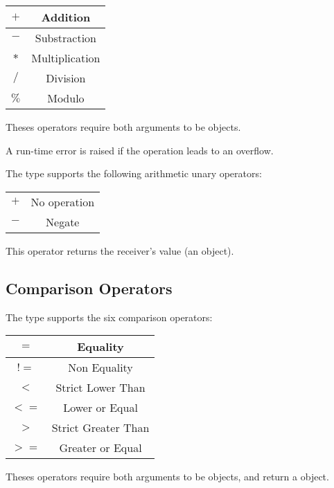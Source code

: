 \begin{tabular}{|c|c|}
\hline
$+$ & Addition \\
\hline
$-$ & Substraction \\
\hline
$*$ & Multiplication \\
\hline
$/$ & Division \\
\hline
$\%$ & Modulo \\
\hline
\end{tabular}

Theses operators require both arguments to be  objects.\newline

A run-time error is raised if the operation leads to an overflow.

The  type supports the following arithmetic unary operators:\newline

\begin{tabular}{|c|c|}
\hline
$+$ & No operation \\
$-$ & Negate \\
\hline
\end{tabular}

This operator returns the receiver's value (an  object).






\subsection{Comparison Operators}

The  type supports the six comparison operators:\newline

\begin{tabular}{|c|c|}
\hline
$=$ & Equality \\
\hline
$!=$ & Non Equality \\
\hline
$<$  & Strict Lower Than \\
\hline
$<=$  & Lower or Equal \\
\hline
$>$  & Strict Greater Than \\
\hline
$>=$  & Greater or Equal \\
\hline
\end{tabular}

Theses operators require both arguments to be  objects, and return a  object.


